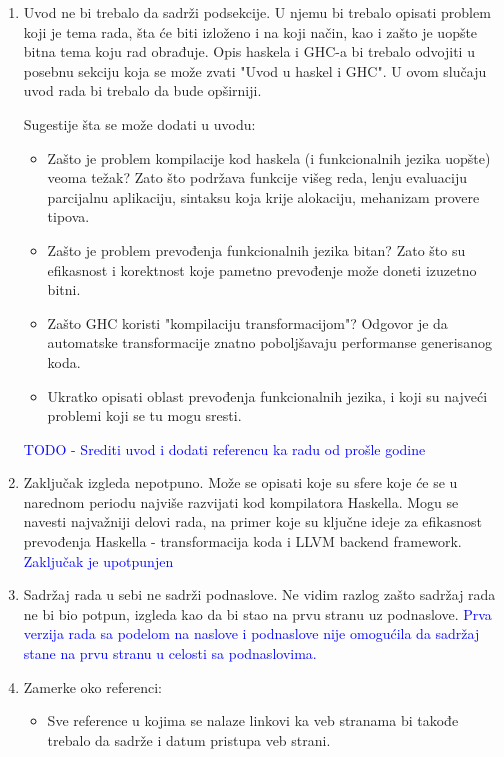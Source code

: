 \documentclass[a4paper]{report}
\newcommand{\odgovor}[1]{\textcolor{blue}{#1}}
\begin{document}
	\begin{enumerate}  
		
		\item Uvod ne bi trebalo da sadrži podsekcije. U njemu bi trebalo opisati problem koji je tema rada, šta će biti izloženo i na koji način, kao i zašto je uopšte bitna tema koju rad obrađuje. Opis haskela i GHC-a bi trebalo odvojiti u posebnu sekciju koja se može zvati "Uvod u haskel i GHC". U ovom slučaju uvod rada bi trebalo da bude opširniji. 
		
		Sugestije šta se može dodati u uvodu:
		\begin{itemize}
			\item Zašto je problem kompilacije kod haskela (i funkcionalnih jezika uopšte) veoma težak? Zato što podržava funkcije višeg reda, lenju evaluaciju parcijalnu aplikaciju, sintaksu koja krije alokaciju, mehanizam provere tipova.
			
			\item Zašto je problem prevođenja funkcionalnih jezika bitan? Zato što su efikasnost i korektnost koje pametno prevođenje može doneti izuzetno bitni. 
			
			\item Zašto GHC koristi "kompilaciju transformacijom"? Odgovor je da automatske transformacije znatno poboljšavaju performanse generisanog koda.
			
			\item Ukratko opisati oblast prevođenja funkcionalnih jezika, i koji su najveći problemi koji se tu mogu sresti.
		\end{itemize}
		\odgovor{TODO - Srediti uvod i dodati referencu ka radu od prošle godine}
		
		
		\item Zaključak izgleda nepotpuno. Može se opisati koje su sfere koje će se u narednom periodu najviše razvijati kod kompilatora Haskella. Mogu se navesti najvažniji delovi rada, na primer koje su ključne ideje za efikasnost prevođenja Haskella - transformacija koda i LLVM backend framework.
		\odgovor{Zaključak je upotpunjen}
		
		
		\item Sadržaj rada u sebi ne sadrži podnaslove. Ne vidim razlog zašto sadržaj rada ne bi bio potpun, izgleda kao da bi stao na prvu stranu uz podnaslove.
		\odgovor{Prva verzija rada sa podelom na naslove i podnaslove nije omogućila da sadržaj stane na prvu stranu u celosti sa podnaslovima.}
		
		\item Zamerke oko referenci:
		\begin{itemize}
			\item Sve reference u kojima se nalaze linkovi ka veb stranama bi takođe trebalo da sadrže i datum pristupa veb strani.
			

\end{itemize}
\end{enumerate}
\end{document}
